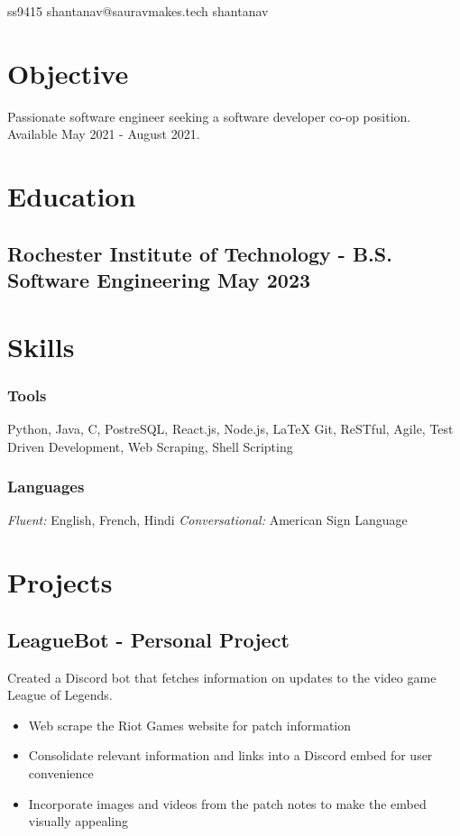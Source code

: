 \documentclass[11pt, letterpaper]{article}
\makeatletter
\renewcommand{\maketitle} {
    \begin{center}    
        {\LARGE\bfseries \theauthor}

        \vspace{.5em}

        \quad 
        \faGithub \quad ss9415 \quad 
        \Letter \quad  shantanav@sauravmakes.tech \quad
        \faLinkedin \quad shantanav \quad  
    \end{center}
    \thispagestyle{empty}
}
\makeatother
\begin{document}
    \author{Shantanav Saurav}
    \maketitle

    \section{Objective}
        Passionate software engineer seeking a software developer co-op position. 
        Available May 2021 - August 2021.
    \section{Education}
        \subsection{Rochester Institute of Technology - B.S. Software Engineering \hfill May 2023}

    \section{Skills}
        \subsubsection{Tools}
            Python, Java, C, PostreSQL, React.js, Node.js, LaTeX Git, ReSTful, Agile,
            Test Driven Development, Web Scraping, Shell Scripting
        \subsubsection{Languages}
            \emph{Fluent:} English, French, Hindi 
            \emph{Conversational:} American Sign Language

    \section{Projects}
        \subsection{LeagueBot - Personal Project}
            Created a Discord bot that fetches information on updates to the video game League 
            of Legends.
            \begin{itemize}[nosep]
                \item Web scrape the Riot Games website for patch information
                \item Consolidate relevant information and links into a Discord embed for user convenience
                \item Incorporate images and videos from the patch notes to make the embed visually appealing
            \end{itemize}
\end{document}
